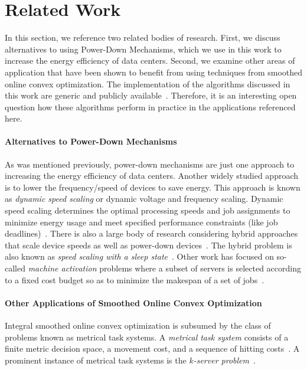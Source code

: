 \section{Related Work}\label{section:introduction:related_work}

In this section, we reference two related bodies of research. First, we discuss alternatives to using Power-Down Mechanisms, which we use in this work to increase the energy efficiency of data centers. Second, we examine other areas of application that have been shown to benefit from using techniques from smoothed online convex optimization. The implementation of the algorithms discussed in this work are generic and publicly available~\cite{Huebotter2021}. Therefore, it is an interesting open question how these algorithms perform in practice in the applications referenced here.

\paragraph{Alternatives to Power-Down Mechanisms} As was mentioned previously, power-down mechanisms are just one approach to increasing the energy efficiency of data centers. Another widely studied approach is to lower the frequency/speed of devices to save energy. This approach is known as \emph{dynamic speed scaling} or dynamic voltage and frequency scaling. Dynamic speed scaling determines the optimal processing speeds and job assignments to minimize energy usage and meet specified performance constraints (like job deadlines)~\cite{Albers2007, Albers2011, Jin2016}. There is also a large body of research considering hybrid approaches that scale device speeds as well as power-down devices~\cite{Jin2016}. The hybrid problem is also known as \emph{speed scaling with a sleep state}~\cite{Albers2014}. Other work has focused on so-called \emph{machine activation} problems where a subset of servers is selected according to a fixed cost budget so as to minimize the makespan of a set of jobs~\cite{Khuller2009, Li2011}.

\paragraph{Other Applications of Smoothed Online Convex Optimization} Integral smoothed online convex optimization is subsumed by the class of problems known as metrical task systems. A \emph{metrical task system} consists of a finite metric decision space, a movement cost, and a sequence of hitting costs~\cite{Bubeck2018_3}. A prominent instance of metrical task systems is the \emph{$k$-server problem}~\cite{Bubeck2017}.

